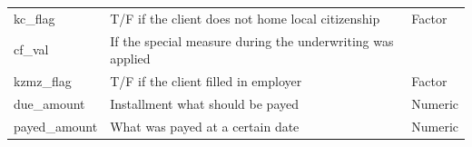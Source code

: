 \documentclass[
]{article}
\begin{document}
\begin{longtable}[]{@{}lll@{}}
\begin{minipage}[t]{0.30\columnwidth}
kc\_flag\strut
\end{minipage} & \begin{minipage}[t]{0.30\columnwidth}\raggedright
T/F if the client does not home local citizenship\strut
\end{minipage} & \begin{minipage}[t]{0.30\columnwidth}\raggedright
Factor\strut
\end{minipage}\tabularnewline
\begin{minipage}[t]{0.30\columnwidth}\raggedright
cf\_val\strut
\end{minipage} & \begin{minipage}[t]{0.30\columnwidth}\raggedright
If the special measure during the underwriting was applied\strut
\end{minipage} & \begin{minipage}[t]{0.30\columnwidth}\raggedright
\strut
\end{minipage}\tabularnewline
\begin{minipage}[t]{0.30\columnwidth}\raggedright
kzmz\_flag\strut
\end{minipage} & \begin{minipage}[t]{0.30\columnwidth}\raggedright
T/F if the client filled in employer\strut
\end{minipage} & \begin{minipage}[t]{0.30\columnwidth}\raggedright
Factor\strut
\end{minipage}\tabularnewline
\begin{minipage}[t]{0.30\columnwidth}\raggedright
due\_amount\strut
\end{minipage} & \begin{minipage}[t]{0.30\columnwidth}\raggedright
Installment what should be payed\strut
\end{minipage} & \begin{minipage}[t]{0.30\columnwidth}\raggedright
Numeric\strut
\end{minipage}\tabularnewline
\begin{minipage}[t]{0.30\columnwidth}\raggedright
payed\_amount\strut
\end{minipage} & \begin{minipage}[t]{0.30\columnwidth}\raggedright
What was payed at a certain date\strut
\end{minipage} & \begin{minipage}[t]{0.30\columnwidth}\raggedright
Numeric\strut
\end{minipage}\tabularnewline
\bottomrule
\end{longtable}
\end{document}
